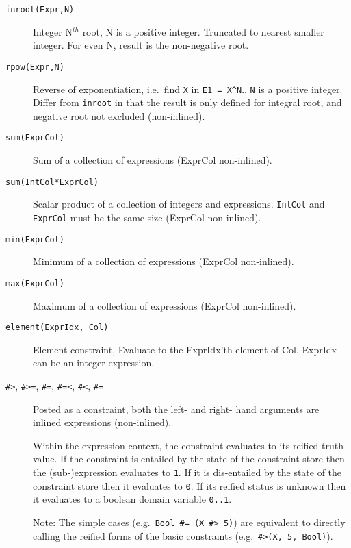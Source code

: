 \begin{description}
\item[\texttt{inroot(Expr,N)}] 
    Integer N$^{th}$ root, N is a positive integer. Truncated to nearest smaller 
    integer. For even N, result is the non-negative root. 

\item[\texttt{rpow(Expr,N)}]
    Reverse of exponentiation, i.e.\ find \texttt{X} in \verb'E1 = X^N'..
    \texttt{N} is a positive integer. Differ from \texttt{inroot} in that
    the result is only defined for integral root, and negative root not
    excluded (non-inlined).

\item[\texttt{sum(ExprCol)}]
            Sum of a collection of expressions (ExprCol non-inlined).

\item[\texttt{sum(IntCol*ExprCol)}]
            Scalar product of a collection of integers and expressions.
            \verb'IntCol' and \verb'ExprCol' must be the same size
	    (ExprCol non-inlined).

\item[\texttt{min(ExprCol)}]
            Minimum of a collection of expressions (ExprCol non-inlined).

\item[\texttt{max(ExprCol)}]
            Maximum of a collection of expressions (ExprCol non-inlined).

\item[\texttt{element(ExprIdx, Col)}]
            Element constraint, Evaluate to the ExprIdx'th element of Col.
	    ExprIdx can be an integer expression.

\item[
    \texttt{\#>}, \texttt{\#>=}, \texttt{\#=}, \texttt{\#=<},
 \texttt{\#<},
    \texttt{\#\bsl=}]

    Posted as a constraint, both the left- and right- hand arguments are
    inlined expressions (non-inlined).

    Within the expression context, the constraint evaluates to its
    reified truth value.  If the constraint is entailed by the
    state of the constraint store then the (sub-)expression
    evaluates to \verb|1|.  If it is dis-entailed by the state of
    the constraint store then it evaluates to \verb|0|. If its
    reified status is unknown then it evaluates to a boolean domain
    variable \verb|0..1|.

\begin{sloppypar}
    Note: The simple cases (e.g.\ \verb|Bool #= (X #> 5)|) are
    equivalent to directly calling the reified forms of the basic
    constraints (e.g.\ \verb|#>(X, 5, Bool)|).
\end{sloppypar}


\end{description}
